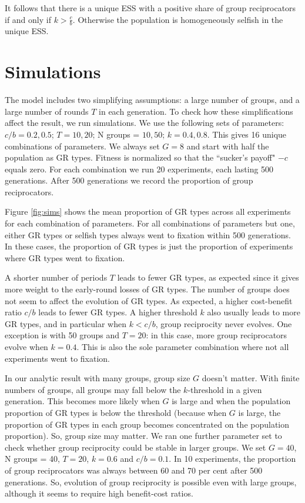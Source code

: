 \documentclass[12pt,a4paper]{article}
\begin{document}
It follows that there is a unique ESS with a positive share of group
reciprocators if and only if $k > \frac{c}{b}$. Otherwise the population is homogeneously selfish in the unique ESS.

\section{Simulations}

The model includes two simplifying assumptions: a large number of groups, and a large
number of rounds $T$ in each generation. To check how these simplifications affect
the result, we run simulations. We use the following sets of parameters:
$c/b = 0.2, 0.5$; $T = 10, 20$; N groups = $10, 50$; $k = 0.4, 0.8$. This gives
16 unique combinations of parameters. We always set $G = 8$ and start with
half the population as GR types. Fitness is normalized so that the ``sucker's payoff"
$-c$ equals zero. For each combination we run 20 experiments, 
each lasting 500 generations. After 500 generations we record the proportion of 
group reciprocators. 

Figure \ref{fig:sims} shows the mean proportion of GR types across all experiments for
each combination of parameters. For all combinations of parameters but one,
either GR types or selfish types always went to fixation within 500 generations. In
these cases, the proportion of GR types is just the proportion of experiments
where GR types went to fixation.

A shorter number of periods $T$ leads to fewer 
GR types, as expected since it gives more weight to the early-round losses of GR 
types. The number of groups does not seem to affect the evolution of GR types. As
expected, a higher cost-benefit ratio $c/b$ leads to fewer GR types. A higher 
threshold $k$ also usually leads to more GR types, and in particular when 
$k < c/b$, group reciprocity never evolves. One exception is with 50 groups
and $T = 20$: in this case, more group reciprocators evolve when $k = 0.4$. 
This is also the sole parameter combination where not all experiments went to 
fixation.


In our analytic result with many groups, group size $G$ doesn't matter. 
With finite numbers of groups, all groups may fall below the $k$-threshold in a
given generation. This becomes more likely when $G$ is large and when the
population proportion of GR types is below the threshold (because when $G$ is
large, the proportion of GR types in each group becomes concentrated on
the population proportion). So, group size may matter. We ran one further 
parameter set to check whether group reciprocity could be
stable in larger groups. We set $G =  40$, N groups = 40, $T = 20$, $k = 0.6$ 
and $c/b = 0.1$. In 10 experiments, the proportion of group reciprocators was
always between 60 and 70 per cent after 500 generations. So, evolution of
group reciprocity is possible even with large groups, although it seems to 
require high benefit-cost ratios.
\end{document}

